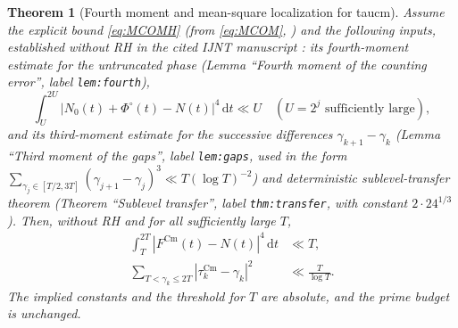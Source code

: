 \documentclass[11pt,a4paper]{article}
\numberwithin{equation}{section}
\newtheorem{theorem}{Theorem}[section]
\theoremstyle{definition}
\theoremstyle{remark}
\newcommand{\Cm}{\mathrm{Cm}}
\newcommand{\dd}{\,\mathrm dt}
\begin{document}
\begin{theorem}[Fourth moment and mean-square localization for taucm]\label{thm:taucm}
Assume the explicit bound \eqref{eq:MCOMH} (from \eqref{eq:MCOM}, \cite{CasanaMCOM}) and the following inputs, established without RH in the cited IJNT manuscript \cite{CasanaIJNT}: its fourth-moment estimate for the \emph{untruncated} phase (Lemma ``Fourth moment of the counting error'', label \texttt{lem:fourth}),
\begin{equation}\label{eq:IJNTinput}
\int_U^{2U}|N_0(t)+\Phi^\circ(t)-N(t)|^4\dd\ll U
\quad(U=2^j\text{ sufficiently large}),
\end{equation}
and its third-moment estimate for the successive differences $\gamma_{k+1}-\gamma_k$ (Lemma ``Third moment of the gaps'', label \texttt{lem:gaps}, used in the form $\sum_{\gamma_j\in[T/2,3T]}(\gamma_{j+1}-\gamma_j)^3\ll T(\log T)^{-2}$) and deterministic sublevel-transfer theorem (Theorem ``Sublevel transfer'', label \texttt{thm:transfer}, with constant $2\cdot24^{1/3}$).
Then, without RH and for all sufficiently large $T$,
\begin{align}
\int_T^{2T}|F^{\Cm}(t)-N(t)|^4\dd&\ll T,\label{eq:cm-fourth}\\
\sum_{T<\gamma_k\le2T}|\tau_k^{\Cm}-\gamma_k|^2
&\ll\frac{T}{\log T}.\label{eq:cm-mean}
\end{align}
The implied constants and the threshold for $T$ are absolute, and the prime budget is unchanged.
\end{theorem}
\end{document}
